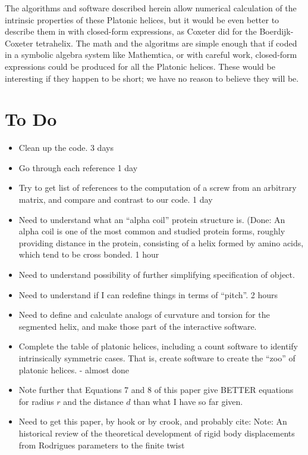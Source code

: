 \documentclass[11pt]{article}
\begin{document}
{The algorithms and software described herein allow numerical calculation of the intrinsic properties of these
Platonic helices, but it would be even better to describe them in with closed-form expressions, as Coxeter did for the Boerdijk-Coxeter tetrahelix.
The math and the algoritms are simple enough that if coded in a symbolic algebra system like Mathemtica, or with careful work, closed-form
expressions could be produced for all the Platonic helices. These would be interesting if they happen to be short; we have no reason to
believe they will be.

\section{ To Do}

\begin{itemize}
\item Clean up the code. 3 days
\item Go through each reference 1 day
\item Try to get list of references to the computation of a screw from an arbitrary matrix, and compare and contrast to our code. 1 day
\item Need to understand what an ``alpha coil'' protein structure is. (Done: An alpha coil is one of the most common
and studied protein forms, roughly providing distance in the protein, consisting of a helix formed by
amino acids, which tend to be cross bonded. 1 hour
\item Need to understand possibility of further simplifying specification of object.
\item Need to understand if I can redefine things in terms of ``pitch''. 2 hours
\item Need to define and calculate analogs of curvature and torsion for the segmented helix, and make those part of
  the interactive software.
\item Complete the table of platonic helices, including a count software to identify intrinsically symmetric cases.
  That is, create software to create the ``zoo'' of platonic helices. - almost done
\item Note further that Equations 7 and 8 of this paper\cite{kahn1989defining} give BETTER equations for radius $r$ and the distance $d$ than what I have so far given.
\item Need to get this paper, by hook or by crook, and probably cite:
  Note: An historical review of the theoretical development of rigid body displacements from Rodrigues parameters to the finite twist

\end{itemize}}
\end{document}
